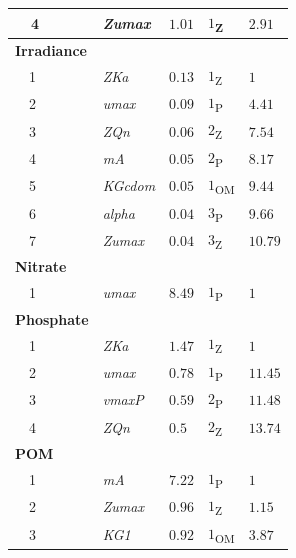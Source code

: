 \documentclass[preprint]{elsarticle}\usepackage[]{graphicx}\usepackage[]{color}
\begin{document}
\begin{table}[!tbp]
{\begin{center}
\begin{tabular}{lllll}
~~4&\scriptsize{\textit{Zumax}}&$1.01$&$1$\textsubscript{Z}&$2.91$\tabularnewline
\hline
{\bfseries Irradiance}&&&&\tabularnewline
~~1&\scriptsize{\textit{ZKa}}&$0.13$&$1$\textsubscript{Z}&$1$\tabularnewline
~~2&\scriptsize{\textit{umax}}&$0.09$&$1$\textsubscript{P}&$4.41$\tabularnewline
~~3&\scriptsize{\textit{ZQn}}&$0.06$&$2$\textsubscript{Z}&$7.54$\tabularnewline
~~4&\scriptsize{\textit{mA}}&$0.05$&$2$\textsubscript{P}&$8.17$\tabularnewline
~~5&\scriptsize{\textit{KGcdom}}&$0.05$&$1$\textsubscript{OM}&$9.44$\tabularnewline
~~6&\scriptsize{\textit{alpha}}&$0.04$&$3$\textsubscript{P}&$9.66$\tabularnewline
~~7&\scriptsize{\textit{Zumax}}&$0.04$&$3$\textsubscript{Z}&$10.79$\tabularnewline
\hline
{\bfseries Nitrate}&&&&\tabularnewline
~~1&\scriptsize{\textit{umax}}&$8.49$&$1$\textsubscript{P}&$1$\tabularnewline
\hline
{\bfseries Phosphate}&&&&\tabularnewline
~~1&\scriptsize{\textit{ZKa}}&$1.47$&$1$\textsubscript{Z}&$1$\tabularnewline
~~2&\scriptsize{\textit{umax}}&$0.78$&$1$\textsubscript{P}&$11.45$\tabularnewline
~~3&\scriptsize{\textit{vmaxP}}&$0.59$&$2$\textsubscript{P}&$11.48$\tabularnewline
~~4&\scriptsize{\textit{ZQn}}&$0.5$&$2$\textsubscript{Z}&$13.74$\tabularnewline
\hline
{\bfseries POM}&&&&\tabularnewline
~~1&\scriptsize{\textit{mA}}&$7.22$&$1$\textsubscript{P}&$1$\tabularnewline
~~2&\scriptsize{\textit{Zumax}}&$0.96$&$1$\textsubscript{Z}&$1.15$\tabularnewline
~~3&\scriptsize{\textit{KG1}}&$0.92$&$1$\textsubscript{OM}&$3.87$\tabularnewline
\hline
\end{tabular}\end{center}}
\end{table}
\end{document}
